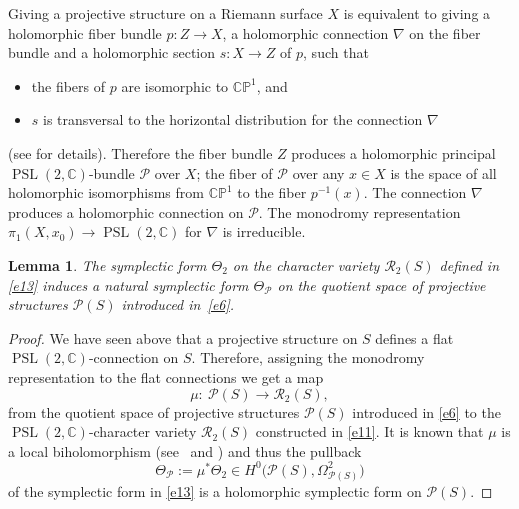 \documentclass[10pt,a4paper]{amsart}
\numberwithin{equation}{section}
\newtheorem{Lemma}[Theorem]{Lemma}
\begin{document}
Giving a projective structure on a Riemann surface $X$ is equivalent to giving a
holomorphic fiber bundle $p\colon Z \longrightarrow X$, a holomorphic connection
$\nabla$ on the fiber bundle and a holomorphic section $s\colon X \longrightarrow Z$
of $p$, such that
\begin{itemize}\itemsep=0pt
\item the fibers of $p$ are isomorphic to ${\mathbb C}{\mathbb P}^1$, and

\item $s$ is transversal to the horizontal distribution for the connection $\nabla$
\end{itemize}
(see \cite{Gu,Hu} for details). Therefore the fiber bundle $Z$ produces a holomorphic principal $\operatorname{PSL}(2,
{\mathbb C})$-bundle $\mathcal P$ over $X$; the fiber of $\mathcal P$ over any $x \in X$ is the space of
all holomorphic isomorphisms from ${\mathbb C}{\mathbb P}^1$ to the fiber $p^{-1}(x)$.
The connection $\nabla$ produces a holomorphic connection on $\mathcal P$. The monodromy representation
$\pi_1(X, x_0) \longrightarrow \operatorname{PSL}(2, {\mathbb C})$ for $\nabla$ is irreducible.

\begin{Lemma}
The symplectic form $\Theta_2$ on the character variety ${\mathcal R}_2(S)$ defined in
\eqref{e13} induces a natural symplectic form $\Theta_{\mathcal P}$ on the
quotient space of projective structures ${\mathcal P}(S)$ introduced in~\eqref{e6}.
\end{Lemma}

\begin{proof}
We have seen above that a projective structure on $S$ defines a flat
$\operatorname{PSL}(2,{\mathbb C})$-connection on $S$. Therefore, assigning
the monodromy representation to the flat connections we get a map
\begin{equation}\label{e12}
\mu\colon\ {\mathcal P}(S) \longrightarrow {\mathcal R}_2(S),
\end{equation}
from the quotient space of projective structures ${\mathcal P}(S)$ introduced in \eqref{e6} to
the $\operatorname{PSL}(2,{\mathbb C})$-character variety ${\mathcal R}_2(S)$ constructed in \eqref{e11}.
It is known that $\mu$ is a local biholomorphism (see~\cite[p.~272]{Hu} and \cite{He}) and thus the
pullback
\begin{equation}\label{e16}
\Theta_{\mathcal P} := \mu^*\Theta_2 \in H^0\bigl({\mathcal P}(S), \Omega^2_{{\mathcal P}(S)}\bigr)
\end{equation}
of the symplectic form in \eqref{e13} is a holomorphic symplectic form
on ${\mathcal P}(S)$.\end{proof}
\end{document}
